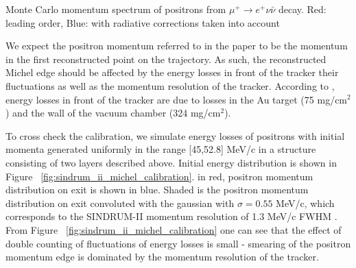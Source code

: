  {
  \label{fig:mu2e_5645_fig_001_mue3_decay}
  Monte Carlo momentum spectrum of positrons from $\mu^+ \rightarrow e^+ \nu \bar{\nu}$
  decay. Red: leading order, Blue: with radiative corrections taken into account
}
\vspace{0.1in}

We expect the positron momentum referred to in the paper
to be the momentum in the first reconstructed point on the trajectory. As such, the
reconstructed Michel edge should be affected by the energy losses in front of the
tracker their fluctuations as well as the momentum resolution of the tracker.
According to \cite{sindrum_ii:Bertl2006}, energy losses in front of the tracker are due to losses in the Au target (75 mg/cm$^2$) and the wall of the vacuum chamber (324 mg/cm$^2$).

To cross check the calibration, we simulate energy losses of positrons with initial
momenta generated uniformly in the range [45,52.8] MeV/c in a structure consisting
of two layers described above. Initial energy distribution is shown
in Figure ~\ref{fig:sindrum_ii_michel_calibration}.
in red, positron momentum distribution on exit is shown in blue.
Shaded is the positron momentum distribution on exit convoluted with
the gaussian with $\sigma = 0.55$ MeV/c, which corresponds to the SINDRUM-II
momentum resolution of 1.3 MeV/c FWHM \cite{sindrum_ii:Kaulard1997_Thesis}.
From Figure ~\ref{fig:sindrum_ii_michel_calibration} one can see that the effect 
of double counting of fluctuations of energy losses is small - smearing of the
positron momentum edge is dominated by the momentum resolution of the tracker.

